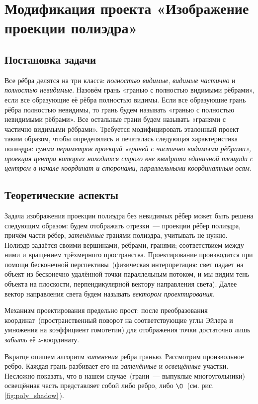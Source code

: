 \section{Модификация проекта «Изображение проекции полиэдра»}

\subsection{Постановка задачи}

Все рёбра делятся на три класса: \emph{полностью видимые}, \emph{видимые частично} и \emph{полностью невидимые}. Назовём грань «гранью с полностью видимыми рёбрами», если все образующие её рёбра полностью видимы. Если все образующие грань рёбра полностью невидимы, то грань будем называть «гранью с полностью невидимыми рёбрами». Все остальные грани будем называть «гранями с частично видимыми рёбрами». Требуется модифицировать эталонный проект таким образом, чтобы определялась и печаталась следующая характеристика полиэдра: \emph{сумма периметров проекций «граней с частично видимыми рёбрами», проекция центра которых находится строго вне квадрата единичной площади с центром в начале координат и сторонами, параллельными координатным осям}.

\subsection{Теоретические аспекты}

Задача изображения проекции полиэдра без невидимых рёбер может быть решена следующим образом: будем отображать отрезки~--- проекции рёбер полиэдра, причём части рёбер, \emph{затенённые} гранями полиэдра, учитывать не нужно.
Полиэдр задаётся своими вершинами, рёбрами, гранями; соответствием между ними и вращением трёхмерного пространства. Проектирование производится при помощи бесконечной перспективы~(физическая интерпретация: свет падает на объект из бесконечно удалённой точки параллельным потоком, и мы видим тень объекта на плоскости, перпендикулярной вектору направления света). Далее вектор направления света будем называть \emph{вектором проектирования}.

Механизм проектирования предельно прост: после преобразования координат~(пространственный поворот на соответствующие углы Эйлера и умножения на коэффициент гомотетии) для отображения точки достаточно лишь \emph{забыть} её $z$-координату.

Вкратце опишем алгоритм \emph{затенения} ребра гранью.
Рассмотрим произвольное ребро. Каждая грань разбивает его на \emph{затенённые} и \emph{освещённые} участки. Несложно показать, что в нашем случае~(грани~--- выпуклые многоугольники) освещённая часть представляет собой либо ребро, либо $\O$~(см. рис.\ref{fig:poly_shadow}\,).

